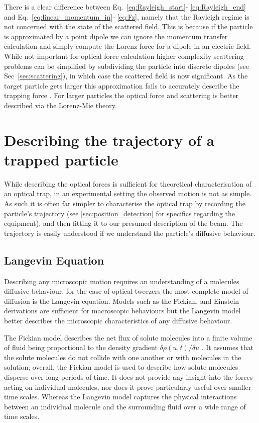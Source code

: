 There is a clear difference between Eq.~\eqref{eq:Rayleigh_start}-
\eqref{eq:Rayleigh_end} and Eq.~\eqref{eq:linear_momentum_in}- \eqref{eq:Fz}, namely that the Rayleigh regime is not concerned with 
the state of the scattered field. This is because if the particle 
is approximated by a point dipole we can ignore the momentum 
transfer calculation and simply compute the Lorenz force for a 
dipole in an electric field. While not important for optical force calculation higher complexity scattering problems can be simplified 
by subdividing the particle into discrete dipoles (see Sec~\ref{sec:scattering}), in which case the scattered field is now significant. As the target particle gets larger this approximation 
fails to accurately describe the trapping force \cite{Li2021}. For 
larger particles the optical force and scattering is better described 
via the Lorenz-Mie theory. 

\section{Describing the trajectory of a trapped particle}
While describing the optical forces is sufficient for 
theoretical characterisation of an optical trap, in an 
experimental setting the observed motion is not as 
simple. As such it is often far simpler to 
characterise the optical trap by recording the particle's
trajectory (see \ref{sec:position_detection} for 
specifics regarding the equipment), and then fitting it 
to our presumed description of the beam. The trajectory 
is easily understood if we understand the particle's 
diffusive behaviour.

\subsection{Langevin Equation}
Describing any microscopic motion requires an understanding 
of a molecules diffusive behaviour, for the case of optical 
tweezers the most complete model of diffusion is the Langevin 
equation. Models such as the Fickian, and Einstein derivations 
are sufficient for macroscopic behaviours but the Langevin 
model better describes the microscopic characteristics of 
any diffusive behaviour.
 
The Fickian model describes the net flux of solute molecules 
into a finite volume of fluid being proportional to the 
density gradient $\delta\rho(u,t)/\delta u$ \cite{Gillespie2012}. 
It assumes that the solute molecules do not collide with one 
another or with molecules in the solution; overall, the Fickian 
model is used to describe how solute molecules disperse over 
long periods of time. It does not provide any insight into 
the forces acting on individual molecules, nor does it prove 
particularly useful over smaller time scales. Whereas the Langevin 
model captures the physical interactions between an individual 
molecule and the surrounding fluid over a wide range of time 
scales.

